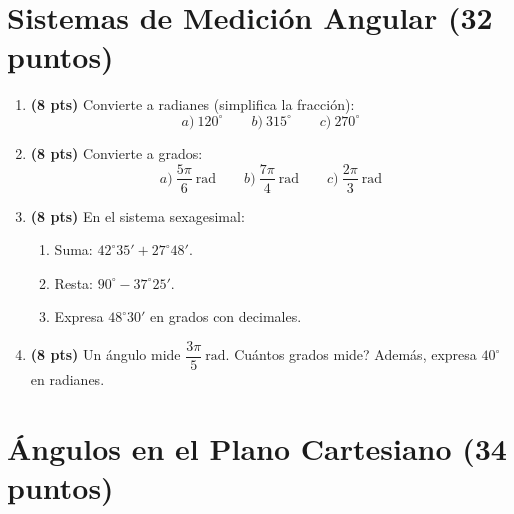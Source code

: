 \documentclass[12pt, letterpaper]{article}
\begin{document}
\newpage

\section{Sistemas de Medición Angular (32 puntos)}

\begin{enumerate}[leftmargin=*]
  \item \textbf{(8 pts)} Convierte a radianes (simplifica la fracción):
        \[
          a)\ 120^{\circ} \qquad b)\ 315^{\circ} \qquad c)\ 270^{\circ}
        \]

  \item \textbf{(8 pts)} Convierte a grados:
        \[
          a)\ \frac{5\pi}{6}\ \text{rad} \qquad b)\ \frac{7\pi}{4}\ \text{rad} \qquad c)\ \frac{2\pi}{3}\ \text{rad}
        \]

  \item \textbf{(8 pts)} En el sistema sexagesimal:
        \begin{enumerate}[label=\alph*)]
          \item Suma: $42^{\circ} 35' + 27^{\circ} 48'$.
          \item Resta: $90^{\circ} - 37^{\circ} 25'$.
          \item Expresa $48^{\circ} 30'$ en grados con decimales.
        \end{enumerate}

  \item \textbf{(8 pts)} Un ángulo mide $\dfrac{3\pi}{5}\ \text{rad}$. \textquestiondown Cuántos grados mide? Además, expresa $40^{\circ}$ en radianes.
\end{enumerate}

\newpage

\section{Ángulos en el Plano Cartesiano (34 puntos)}
\end{document}
